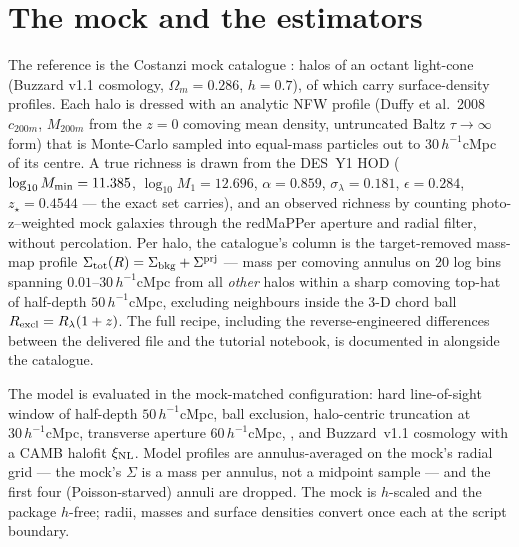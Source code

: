 \section{The mock and the estimators}
\label{sec:mock}

The reference is the Costanzi mock catalogue
: \NHalosTotal{} halos of an
octant light-cone (Buzzard v1.1 cosmology, $\Omega_m = 0.286$,
$h = 0.7$), of which \NHalosProfiled{} carry surface-density profiles.
Each halo is dressed with an analytic NFW profile (Duffy et al.\ 2008
$c_{200m}$, $M_{200m}$ from the $z{=}0$ comoving mean density,
untruncated Baltz $\tau \to \infty$ form) that is Monte-Carlo sampled
into equal-mass particles out to $30\,h^{-1}$cMpc of its centre. A true
richness is drawn from the DES~Y1 HOD
($\log_{10} M_{\rm min} = 11.385$, $\log_{10} M_1 = 12.696$,
$\alpha = 0.859$, $\sigma_\lambda = 0.181$, $\epsilon = 0.284$,
$z_\star = 0.4544$ --- the exact set 
carries), and an observed richness by counting photo-z--weighted mock
galaxies through the redMaPPer aperture and radial filter, without
percolation. Per halo, the catalogue's  column is the target-removed
mass-map profile $\Sigma_{\rm tot}(R) = \Sigma_{\rm bkg} + \Sigma^{\rm prj}$ --- mass per comoving annulus on 20
log bins spanning $0.01$--$30\,h^{-1}$cMpc from all \emph{other} halos
within a sharp comoving top-hat of half-depth $50\,h^{-1}$cMpc,
excluding neighbours inside the 3-D chord ball
$R_{\rm excl} = R_\lambda(1+z)$. The full recipe, including the reverse-engineered
differences between the delivered file and the tutorial notebook, is
documented in  alongside the catalogue.

The model is evaluated in the mock-matched configuration: hard
line-of-sight window of half-depth $50\,h^{-1}$cMpc, ball exclusion,
halo-centric truncation at $30\,h^{-1}$cMpc, transverse aperture
$60\,h^{-1}$cMpc, , and Buzzard~v1.1
cosmology with a CAMB halofit $\xi_{\rm NL}$. Model profiles are
annulus-averaged on the mock's radial grid --- the mock's $\Sigma$ is a
mass per annulus, not a midpoint sample --- and the first four
(Poisson-starved) annuli are dropped. The mock is $h$-scaled and the
package $h$-free; radii, masses and surface densities convert once each
at the script boundary.

